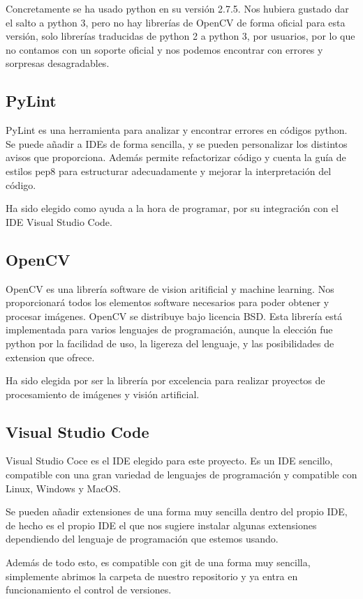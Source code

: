 Concretamente se ha usado python en su versión 2.7.5.
Nos hubiera gustado dar el salto a python 3, pero no hay librerías de OpenCV de forma oficial para esta versión, solo librerías traducidas de python 2 a python 3, por usuarios, por lo que no contamos con un soporte oficial y nos podemos encontrar con errores y sorpresas desagradables.


\subsection{PyLint}
PyLint es una herramienta para analizar y encontrar errores en códigos python. Se puede añadir a IDEs de forma sencilla, y se pueden personalizar los distintos avisos que proporciona. 
Además permite refactorizar código y cuenta la guía de estilos pep8\cite{pep8} para estructurar adecuadamente y mejorar la interpretación del código.

Ha sido elegido como ayuda a la hora de programar, por su integración con el IDE Visual Studio Code.

\subsection{OpenCV}
OpenCV es una librería software de vision aritificial y machine learning. Nos proporcionará todos los elementos software necesarios para poder obtener y procesar imágenes. 
OpenCV se distribuye bajo licencia BSD. 
Esta librería está implementada para varios lenguajes de programación, aunque la elección fue python por la facilidad de uso, la ligereza del lenguaje, y las posibilidades de extension que ofrece.

Ha sido elegida por ser la librería por excelencia para realizar proyectos de procesamiento de imágenes y visión artificial.

\subsection{Visual Studio Code}
Visual Studio Coce es el IDE elegido para este proyecto. Es un IDE sencillo, compatible con una gran variedad de lenguajes de programación y compatible con Linux, Windows y MacOS.
 
Se pueden añadir extensiones de una forma muy sencilla dentro del propio IDE, de hecho es el propio IDE el que nos sugiere instalar algunas extensiones dependiendo del lenguaje de programación que estemos usando. 

Además de todo esto, es compatible con git de una forma muy sencilla, simplemente abrimos la carpeta de nuestro repositorio y ya entra en funcionamiento el control de versiones.

